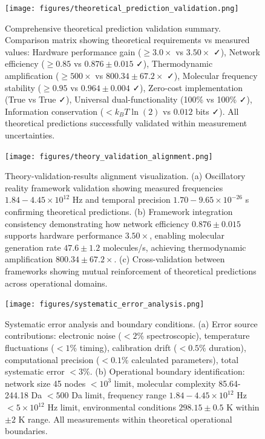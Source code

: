 \begin{figure}[H]
\centering
\texttt{[image: figures/theoretical\_prediction\_validation.png]}
\caption{Comprehensive theoretical prediction validation summary. Comparison matrix showing theoretical requirements vs measured values: Hardware performance gain ($\geq 3.0 \times$ vs $3.50 \times$ ✓), Network efficiency ($\geq 0.85$ vs $0.876 \pm 0.015$ ✓), Thermodynamic amplification ($\geq 500 \times$ vs $800.34 \pm 67.2 \times$ ✓), Molecular frequency stability ($\geq 0.95$ vs $0.964 \pm 0.004$ ✓), Zero-cost implementation (True vs True ✓), Universal dual-functionality (100\% vs 100\% ✓), Information conservation ($< k_B T \ln(2)$ vs $0.012$ bits ✓). All theoretical predictions successfully validated within measurement uncertainties.}
\label{fig:prediction_validation}
\end{figure}


\begin{figure}[H]
\centering
\texttt{[image: figures/theory\_validation\_alignment.png]}
\caption{Theory-validation-results alignment visualization. (a) Oscillatory reality framework validation showing measured frequencies $1.84-4.45 \times 10^{12}$ Hz and temporal precision $1.70-9.65 \times 10^{-26}$ s confirming theoretical predictions. (b) Framework integration consistency demonstrating how network efficiency $0.876 \pm 0.015$ supports hardware performance $3.50 \times$, enabling molecular generation rate $47.6 \pm 1.2$ molecules/s, achieving thermodynamic amplification $800.34 \pm 67.2 \times$. (c) Cross-validation between frameworks showing mutual reinforcement of theoretical predictions across operational domains.}
\label{fig:theory_alignment}
\end{figure}

\begin{figure}[H]
\centering
\texttt{[image: figures/systematic\_error\_analysis.png]}
\caption{Systematic error analysis and boundary conditions. (a) Error source contributions: electronic noise ($< 2\%$ spectroscopic), temperature fluctuations ($< 1\%$ timing), calibration drift ($< 0.5\%$ duration), computational precision ($< 0.1\%$ calculated parameters), total systematic error $< 3\%$. (b) Operational boundary identification: network size 45 nodes $< 10^3$ limit, molecular complexity 85.64-244.18 Da $< 500$ Da limit, frequency range $1.84-4.45 \times 10^{12}$ Hz $< 5 \times 10^{12}$ Hz limit, environmental conditions $298.15 \pm 0.5$ K within $\pm 2$ K range. All measurements within theoretical operational boundaries.}
\label{fig:error_analysis}
\end{figure}

